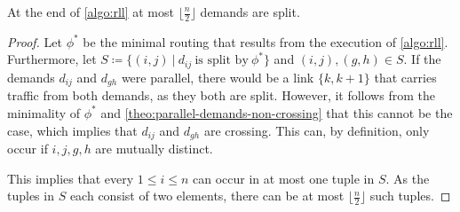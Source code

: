 \begin{lemma}
	At the end of \cref{algo:rll} at most $\lfloor\frac{n}{2}\rfloor$ demands are split.
\end{lemma}
\begin{proof}
	Let $\phi^\ast$ be the minimal routing that results from the execution of \cref{algo:rll}.
	Furthermore, let $S \coloneqq \{(i, j)\ |\ d_{ij}\ \text{is split by}\ \phi^\ast \}$ and $(i, j), (g, h) \in S$.
	If the demands $d_{ij}$ and $d_{gh}$ were parallel, there would be a link $\{k, k+1\}$ that carries traffic from both demands, as they both are split.
	However, it follows from the minimality of $\phi^\ast$ and \cref{theo:parallel-demands-non-crossing} that this cannot be the case, which implies that $d_{ij}$ and $d_{gh}$ are crossing.
	This can, by definition, only occur if $i, j, g, h$ are mutually distinct.
	
	This implies that every $1 \leq i \leq n$ can occur in at most one tuple in $S$.
	As the tuples in $S$ each consist of two elements, there can be at most $\lfloor\frac{n}{2}\rfloor$ such tuples.
\end{proof}
